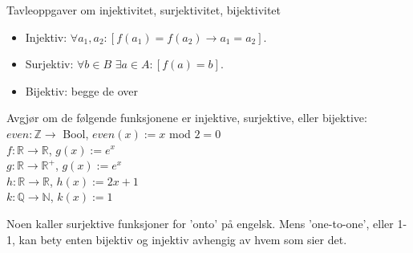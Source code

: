 \begin{frame}{Tavleoppgaver om injektivitet, surjektivitet, bijektivitet}
    \begin{itemize}
        \item Injektiv:  $\forall a_1, a_2 : [f(a_1) = f(a_2) \rightarrow a_1 = a_2]$.\\
        \item Surjektiv: $\forall b \in B$  $\exists a \in A : [f(a) = b]$.\\
        \item Bijektiv: begge de over \\
    \end{itemize}
    \pause
    \begin{block}{Avgjør om de følgende funksjonene er injektive, surjektive, eller bijektive:}
        $even : \mathbb{Z} \rightarrow $ Bool, $even(x) := x$ mod $2 = 0$\\
        $f : \mathbb{R} \rightarrow \mathbb{R}$, $g(x) := e^x$\\
        $g : \mathbb{R} \rightarrow \mathbb{R}^+$, $g(x) := e^x$\\
        $h : \mathbb{R} \rightarrow \mathbb{R}$, $h(x) := 2x + 1$\\
        $k : \mathbb{Q} \rightarrow \mathbb{N}$, $k(x) := 1$\\
    \end{block}
    \pause
    Noen kaller surjektive funksjoner for 'onto' på engelsk. Mens 'one-to-one', eller 1-1, kan bety enten bijektiv og injektiv avhengig av hvem som sier det.
\end{frame}

